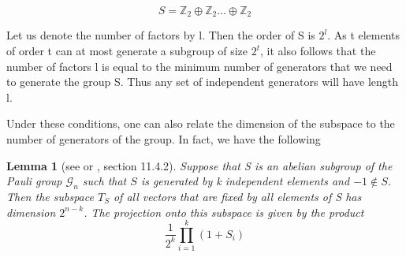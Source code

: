 \documentclass[a4paper, draft]{article}
\theoremstyle{own}
\newtheorem{lem}[thm]{Lemma}
\theoremstyle{remark}
\newcommand{\Z}{\mathbb{Z}}
\begin{document}
$$
S = {\Z}_2  \oplus \Z_2 \dots \oplus \Z_2
$$

Let us denote the number of factors by l. Then the order of S is $2^l$. As t elements of order t can at most generate a subgroup of size $2^t$, it also follows that the number of factors l is equal to the minimum number of generators that we need to generate the group S. Thus any set of independent generators will have length l. 

Under these conditions, one can also relate the dimension of the subspace to the number of generators of the group. In fact, we have the following

\begin{lem}[see \cite{G2} or \cite{RieffelPolak}, section 11.4.2]\label{lem:stabilizerdimension}
Suppose that S is an abelian subgroup of the Pauli group $\mathcal{G}_n$ such that $S$ is generated by k independent elements and $-1 \notin S$. Then the subspace $T_S$ of all vectors that are fixed by all elements of S has dimension $2^{n-k}$.  The projection onto this subspace is given by the product
$$
\frac{1}{2^k} \prod_{i=1}^k (1 + S_i)
$$
\end{lem}
\end{document}
